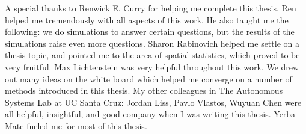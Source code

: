 
\begin{acknowledgements}

\noindent A special thanks to Renwick E. Curry for helping me complete this thesis. Ren helped me tremendously with all aspects of this work. He also taught me the following: we do simulations to answer certain questions, but the results of the simulations raise even more questions. Sharon Rabinovich helped me settle on a thesis topic, and pointed me to the area of spatial statistics, which proved to be very fruitful. Max Lichtenstein was very helpful throughout this work. We drew out many ideas on the white board which helped me converge on a number of methods introduced in this thesis. My other colleagues in The Autonomous Systems Lab at UC Santa Cruz: Jordan Liss, Pavlo Vlastos, Wuyuan Chen were all helpful, insightful, and good company when I was writing this thesis. Yerba Mate fueled me for most of this thesis.\\

\end{acknowledgements}